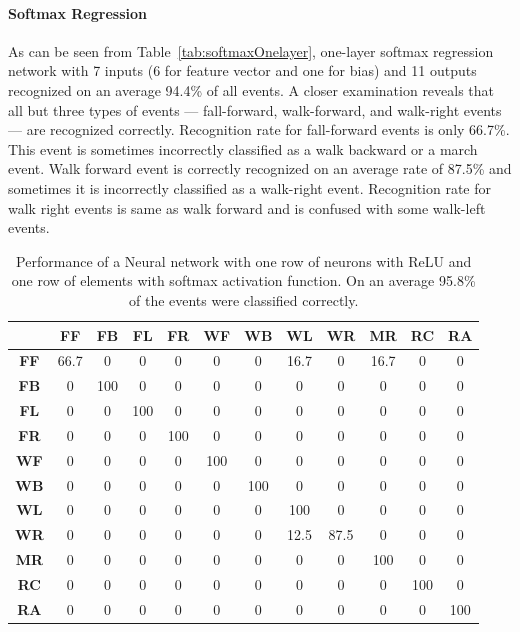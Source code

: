\documentclass[]{IEEEtran}
\begin{document}
 \paragraph{Softmax Regression} \label{sec:SoftmaxRegression} As can be seen
from Table~\ref{tab:softmaxOnelayer}, one-layer softmax regression network with
7 inputs (6 for feature vector and one for bias) and 11 outputs recognized on
an average 94.4\% of all  events. A closer examination reveals that all but
three types of events --- fall-forward, walk-forward, and walk-right events
--- are recognized correctly. Recognition rate for fall-forward events is only
66.7\%. This event is sometimes  incorrectly classified as a walk backward or a
march event. Walk forward event is correctly recognized on an average rate of
87.5\% and sometimes it is incorrectly classified as a walk-right event.
Recognition rate for walk right events is same as walk forward and is confused
with  some  walk-left events.  \begin{table}[htb] \caption{Performance of a
Neural network with one row of neurons with ReLU and one row of elements with
softmax activation function. On an average 95.8\% of the events were classified
correctly.} \label{tbl:neuralNetworkOneLayer}
\resizebox{\columnwidth}{!}
{
\begin{tabular}{|c|c|c|c|c|c|c|c|c|c|c|c|}
\hline 
& \textbf{FF} & \textbf{FB}  & \textbf{FL} & \textbf{FR} &  \textbf{WF} & 
\textbf{WB} & \textbf{WL} & \textbf{WR} & \textbf{MR} & 
\textbf{RC} & \textbf{RA} \\ \hline
\textbf{FF} & 66.7 &  0 &  0 &  0 &  0 &  0 &  16.7 &  0 &  16.7 &  0 &  0 \\ \hline
\textbf{FB} & 0 &  100 &  0 &  0 &  0 &  0 &  0 &  0 &  0 &  0 &  0 \\ \hline
\textbf{FL} & 0 &  0 &  100 &  0 &  0 &  0 &  0 &  0 &  0 &  0 &  0 \\ \hline
\textbf{FR} & 0 &  0 &  0 &  100 &  0 &  0 &  0 &  0 &  0 &  0 &  0 \\ \hline
\textbf{WF} & 0 &  0 &  0 &  0 &  100 &  0 &  0 &  0 &  0 &  0 &  0 \\ \hline
\textbf{WB} & 0 &  0 &  0 &  0 &  0 &  100 &  0 &  0 &  0 &  0 &  0 \\ \hline
\textbf{WL} & 0 &  0 &  0 &  0 &  0 &  0 &  100 &  0 &  0 &  0 &  0 \\ \hline
\textbf{WR} & 0 &  0 &  0 &  0 &  0 &  0 &  12.5 &  87.5 &  0 &  0 &  0 \\ \hline
\textbf{MR} & 0 &  0 &  0 &  0 &  0 &  0 &  0 &  0 &  100 &  0 &  0 \\ \hline
\textbf{RC} & 0 &  0 &  0 &  0 &  0 &  0 &  0 &  0 &  0 &  100 &  0 \\ \hline
\textbf{RA} & 0 &  0 &  0 &  0 &  0 &  0 &  0 &  0 &  0 &  0 &  100 \\ \hline
\end{tabular}
}
\end{table}
\end{document}
